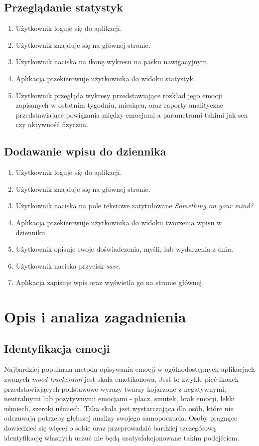 \documentclass[inz, shortabstract]{iithesis}
\begin{document}
\section{Przeglądanie statystyk}
\begin{enumerate}
	\item Użytkownik loguje się do aplikacji.
	\item Użytkownik znajduje się na głównej stronie.
	\item Użytkownik naciska na ikonę wykresu na pasku nawigacyjnym.
	\item Aplikacja przekierowuje użytkownika do widoku statystyk.
	\item Użytkownik przegląda wykresy przedstawiające rozkład jego emocji zapisanych w ostatnim tygodniu, miesiącu, oraz raporty analityczne przedstawiające powiązania między emocjami a parametrami takimi jak sen czy aktywność fizyczna.
\end{enumerate}

\section{Dodawanie wpisu do dziennika}
\begin{enumerate}
	\item Użytkownik loguje się do aplikacji.
	\item Użytkownik znajduje się na głównej stronie.
	\item Użytkownik naciska na pole tekstowe zatytułowane \textit{Something on your mind?}
	\item Aplikacja przekierowuje użytkownika do widoku tworzenia wpisu w dzienniku.
	\item Użytkownik opisuje swoje doświadczenia, myśli, lub wydarzenia z dnia.
	\item Użytkownik naciska przycisk \textit{save}.
	\item Aplikacja zapisuje wpis oraz wyświetla go na stronie głównej.
\end{enumerate}



\chapter{Opis i analiza zagadnienia}
\section{Identyfikacja emocji}
Najbardziej popularną metodą opisywania emocji w ogólnodostępnych aplikacjach zwanych \textit{mood trackerami} jest skala emotikonowa. Jest to zwykle pięć ikonek przedstawiających podstawowe wyrazy twarzy kojarzone z negatywnymi, neutralnymi lub pozytywnymi emocjami - płacz, smutek, brak emocji, lekki uśmiech, szeroki uśmiech. Taka skala jest wystarczająca dla osób, które nie odczuwają potrzeby głębszej analizy swojego samopoczucia. Osoby pragnące dowiedzieć się więcej o sobie oraz przeprowadzić bardziej szczegółową identyfikację własnych uczuć nie będą usatysfakcjonowane takim podejściem. 
\end{document}
